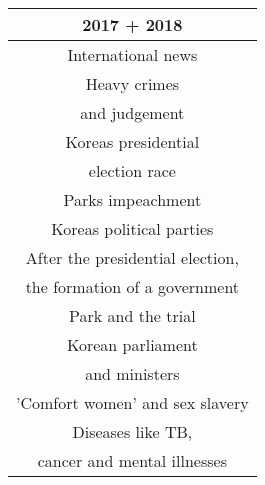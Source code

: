 \begin{table}[ht]
  \hspace{1cm}
  \begin{tabular}{c}
  2017 + 2018 \\
  \hline
  \hline
  International news \\
  \hline
  Heavy crimes \\
  and judgement \\
  \hline
  Koreas presidential \\
  election race \\
  \hline
  Parks impeachment \\
  \hline
  Koreas political parties \\
  \hline
  After the presidential election, \\
  the formation of a government \\
  \hline
  Park and the trial \\
  \hline
  Korean parliament \\
  and ministers \\
  \hline
  'Comfort women' and sex slavery \\
  \hline
  Diseases like TB, \\
  cancer and mental illnesses \\
  \end{tabular}
\end{table}